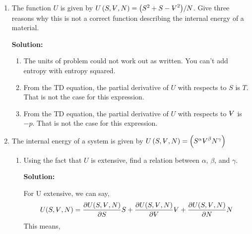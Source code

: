 \documentclass[10pt]{article}
\newenvironment{Solution}
    {\textbf{Solution:}
    
    \vspace{5mm}
    \begin{tcolorbox}
    }
    {
    \end{tcolorbox}
    \vspace{5mm}
    }
\newcommand{\vol}{{\ooalign{\hfil$V$\hfil\cr\kern0.08em--\hfil\cr}}}
\begin{document}

\begin{enumerate}



\item The function  $U$ is given by $U\left(S,\vol,N\right) = {\left(S^2+S-\vol^2\right)}/{N}$. Give three reasons why this is not a correct function describing the internal energy of a material.


\begin{Solution}
\begin{enumerate}
    \item The units of problem could not work out as written. You can't add entropy with entropy squared.
    \item From the TD equation, the partial derivative of $U$ with respects to $S$ is $T$. That is not the case for this expression.
    \item From the TD equation, the partial derivative of $U$ with respects to $\vol$ is $-p$. That is not the case for this expression.

\end{enumerate}
\end{Solution}
\newpage

\item The internal energy of a system is given by  $U\left(S,\vol,N\right) = {\left(S^\alpha \vol^\beta N^\gamma \right)}$
\begin{enumerate}
    \item Using the fact that $U$ is extensive, find a relation between $\alpha$, $\beta$, and $\gamma$.
    
    \begin{Solution}
    For U extensive, we can say,
    \begin{equation}\label{extensive}
    U(S, \vol, N)=\frac{\partial U(S, \vol, N)}{\partial S} S + \frac{\partial U(S, \vol, N)}{\partial \vol} \vol + \frac{\partial U(S, \vol, N)}{\partial N} N
    \end{equation}
    This means,
    

\end{Solution}
\end{enumerate}
\end{enumerate}
\end{document}
